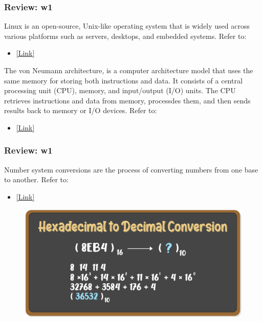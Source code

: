 \documentclass[
	11pt, %
]{beamer}
\begin{document}

\begin{frame}
	\frametitle{Review: w1}

Linux is an open-source, Unix-like operating system that is widely used across various platforms such as servers, desktops, and embedded systems. Refer to:
\begin{itemize}
    \item \href{https://www.linuxfoundation.org/what-is-linux/}{[Link]}
\end{itemize}

\vspace{0.5cm}

The von Neumann architecture, is a computer architecture model that uses the same memory for storing both instructions and data. It consists of a central processing unit (CPU), memory, and input/output (I/O) units. The CPU retrieves instructions and data from memory, processdes them, and then sends results back to memory or I/O devices. Refer to:
\begin{itemize}
    \item \href{https://www.britannica.com/technology/von-Neumann-machine}{[Link]}
\end{itemize}


\end{frame}


\begin{frame}
	\frametitle{Review: w1}
Number system conversions are the process of converting numbers from one base to another. Refer to:
\begin{itemize}
    \item \href{https://www.geeksforgeeks.org/number-system-in-maths/}{[Link]}
\end{itemize}


	\begin{figure}
		\includegraphics[width=0.8\linewidth]{hextodec.png}
	\end{figure}



\end{frame}
\end{document}
